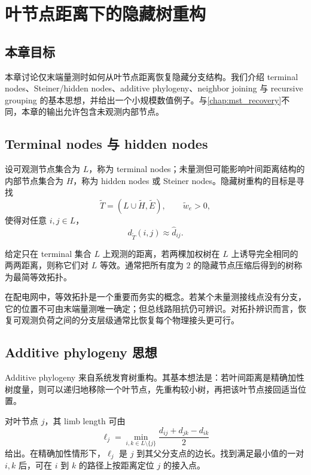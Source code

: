 \chapter{叶节点距离下的隐藏树重构}
\label{chap:hidden_tree}

\section*{本章目标}
本章讨论仅末端量测时如何从叶节点距离恢复隐藏分支结构。我们介绍 terminal nodes、Steiner/hidden nodes、additive phylogeny、neighbor joining 与 recursive grouping 的基本思想，并给出一个小规模数值例子。与\cref{chap:mst_recovery}不同，本章的输出允许包含未观测内部节点。

\section{Terminal nodes 与 hidden nodes}

设可观测节点集合为 $L$，称为 terminal nodes；未量测但可能影响叶间距离结构的内部节点集合为 $H$，称为 hidden nodes 或 Steiner nodes。隐藏树重构的目标是寻找
\begin{equation}
  \widetilde T=(L\cup \widetilde H,\widetilde E),\qquad \widetilde w_e>0,
\end{equation}
使得对任意 $i,j\in L$，
\begin{equation}
  d_{\widetilde T}(i,j)\approx \widehat d_{ij}.
\end{equation}

\begin{definition}[等效拓扑]
给定只在 terminal 集合 $L$ 上观测的距离，若两棵加权树在 $L$ 上诱导完全相同的两两距离，则称它们对 $L$ 等效。通常把所有度为 $2$ 的隐藏节点压缩后得到的树称为最简等效拓扑。
\end{definition}

在配电网中，等效拓扑是一个重要而务实的概念。若某个未量测接线点没有分支，它的位置不可由末端量测唯一确定；但总线路阻抗仍可辨识。对拓扑辨识而言，恢复可观测负荷之间的分支层级通常比恢复每个物理接头更可行。

\section{Additive phylogeny 思想}

Additive phylogeny 来自系统发育树重构。其基本想法是：若叶间距离是精确加性树度量，则可以递归地移除一个叶节点，先重构较小树，再把该叶节点接回适当位置。

对叶节点 $j$，其 limb length 可由
\begin{equation}
  \ell_j=\min_{i,k\in L\setminus\{j\}}
  \frac{d_{ij}+d_{jk}-d_{ik}}{2}
  \label{eq:limb_length}
\end{equation}
给出。在精确加性情形下，$\ell_j$ 是 $j$ 到其父分支点的边长。找到满足最小值的一对 $i,k$ 后，可在 $i$ 到 $k$ 的路径上按距离定位 $j$ 的接入点。

